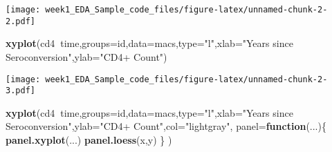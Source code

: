 \documentclass[]{article}
\newenvironment{Shaded}{\begin{snugshade}}{\end{snugshade}}
\newcommand{\CommentTok}[1]{\textcolor[rgb]{0.56,0.35,0.01}{\textit{#1}}}
\newcommand{\ControlFlowTok}[1]{\textcolor[rgb]{0.13,0.29,0.53}{\textbf{#1}}}
\newcommand{\DataTypeTok}[1]{\textcolor[rgb]{0.13,0.29,0.53}{#1}}
\newcommand{\DecValTok}[1]{\textcolor[rgb]{0.00,0.00,0.81}{#1}}
\newcommand{\KeywordTok}[1]{\textcolor[rgb]{0.13,0.29,0.53}{\textbf{#1}}}
\newcommand{\NormalTok}[1]{#1}
\newcommand{\OperatorTok}[1]{\textcolor[rgb]{0.81,0.36,0.00}{\textbf{#1}}}
\newcommand{\StringTok}[1]{\textcolor[rgb]{0.31,0.60,0.02}{#1}}
\begin{document}
\begin{Shaded}
\end{Shaded}

\texttt{[image: week1\_EDA\_Sample\_code\_files/figure-latex/unnamed-chunk-2-2.pdf]}

\begin{Shaded}
\begin{Highlighting}[]
\KeywordTok{xyplot}\NormalTok{(cd4}\OperatorTok{~}\NormalTok{time,}\DataTypeTok{groups=}\NormalTok{id,}\DataTypeTok{data=}\NormalTok{macs,}\DataTypeTok{type=}\StringTok{"l"}\NormalTok{,}\DataTypeTok{xlab=}\StringTok{"Years since Seroconversion"}\NormalTok{,}\DataTypeTok{ylab=}\StringTok{"CD4+ Count"}\NormalTok{)}
\end{Highlighting}
\end{Shaded}

\texttt{[image: week1\_EDA\_Sample\_code\_files/figure-latex/unnamed-chunk-2-3.pdf]}

\begin{Shaded}
\begin{Highlighting}[]
\KeywordTok{xyplot}\NormalTok{(cd4}\OperatorTok{~}\NormalTok{time,}\DataTypeTok{groups=}\NormalTok{id,}\DataTypeTok{data=}\NormalTok{macs,}\DataTypeTok{type=}\StringTok{"l"}\NormalTok{,}\DataTypeTok{xlab=}\StringTok{"Years since Seroconversion"}\NormalTok{,}\DataTypeTok{ylab=}\StringTok{"CD4+ Count"}\NormalTok{,}\DataTypeTok{col=}\StringTok{"lightgray"}\NormalTok{,}
       \DataTypeTok{panel=}\ControlFlowTok{function}\NormalTok{(...)\{}
         \KeywordTok{panel.xyplot}\NormalTok{(...)}
         \KeywordTok{panel.loess}\NormalTok{(x,y)}
\NormalTok{       \}}
\NormalTok{)}
\end{Highlighting}
\end{Shaded}
\end{document}
